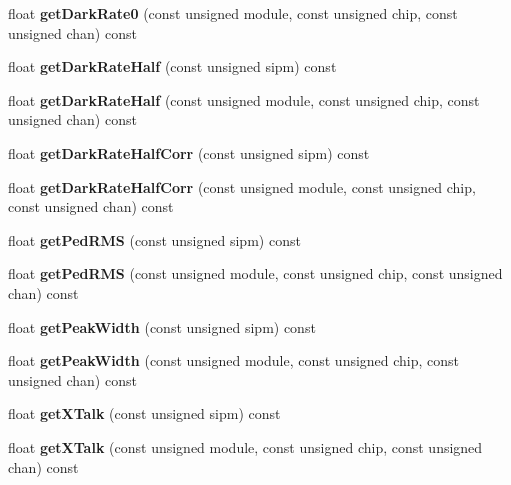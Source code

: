 \begin{DoxyCompactItemize}
\item 
float {\bfseries getDarkRate0} (const unsigned module, const unsigned chip, const unsigned chan) const \label{classCALICE_1_1SiPmPropertiesProcessor_a8dda757457c5f5f7be9cbe82a31c611e}

\item 
float {\bfseries getDarkRateHalf} (const unsigned sipm) const \label{classCALICE_1_1SiPmPropertiesProcessor_af67aa9d6cd8306769a804d329092e997}

\item 
float {\bfseries getDarkRateHalf} (const unsigned module, const unsigned chip, const unsigned chan) const \label{classCALICE_1_1SiPmPropertiesProcessor_a51b2b403c16e111b0074849370609d4d}

\item 
float {\bfseries getDarkRateHalfCorr} (const unsigned sipm) const \label{classCALICE_1_1SiPmPropertiesProcessor_ac01a00304f1671020af7089dd869a63c}

\item 
float {\bfseries getDarkRateHalfCorr} (const unsigned module, const unsigned chip, const unsigned chan) const \label{classCALICE_1_1SiPmPropertiesProcessor_afeb80918c3af62a8ea86bd10afb28164}

\item 
float {\bfseries getPedRMS} (const unsigned sipm) const \label{classCALICE_1_1SiPmPropertiesProcessor_a10069f2e761eeab5b2f8a5b46de4a7c1}

\item 
float {\bfseries getPedRMS} (const unsigned module, const unsigned chip, const unsigned chan) const \label{classCALICE_1_1SiPmPropertiesProcessor_abd317d4bf9019e63864b41945a08c5b4}

\item 
float {\bfseries getPeakWidth} (const unsigned sipm) const \label{classCALICE_1_1SiPmPropertiesProcessor_a122927747aaaf7962f73950415e69be2}

\item 
float {\bfseries getPeakWidth} (const unsigned module, const unsigned chip, const unsigned chan) const \label{classCALICE_1_1SiPmPropertiesProcessor_a821960e9dea7268b585c04af86278729}

\item 
float {\bfseries getXTalk} (const unsigned sipm) const \label{classCALICE_1_1SiPmPropertiesProcessor_a49ccb27604b3989489866b70385a9c38}

\item 
float {\bfseries getXTalk} (const unsigned module, const unsigned chip, const unsigned chan) const \label{classCALICE_1_1SiPmPropertiesProcessor_a9a89b6008d0d60bb0b60b6b9d266d236}


\end{DoxyCompactItemize}
